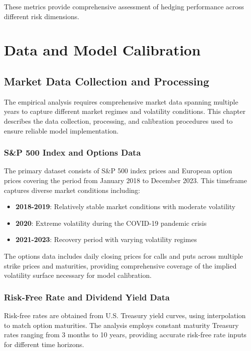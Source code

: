 \documentclass[12pt,a4paper]{report}
\begin{document}
These metrics provide comprehensive assessment of hedging performance across different risk dimensions.

\chapter{Data and Model Calibration}

\section{Market Data Collection and Processing}

The empirical analysis requires comprehensive market data spanning multiple years to capture different market regimes and volatility conditions. This chapter describes the data collection, processing, and calibration procedures used to ensure reliable model implementation.

\subsection{S\&P 500 Index and Options Data}

The primary dataset consists of S\&P 500 index prices and European option prices covering the period from January 2018 to December 2023. This timeframe captures diverse market conditions including:

\begin{itemize}
\item \textbf{2018-2019}: Relatively stable market conditions with moderate volatility
\item \textbf{2020}: Extreme volatility during the COVID-19 pandemic crisis
\item \textbf{2021-2023}: Recovery period with varying volatility regimes
\end{itemize}

The options data includes daily closing prices for calls and puts across multiple strike prices and maturities, providing comprehensive coverage of the implied volatility surface necessary for model calibration.

\subsection{Risk-Free Rate and Dividend Yield Data}

Risk-free rates are obtained from U.S. Treasury yield curves, using interpolation to match option maturities. The analysis employs constant maturity Treasury rates ranging from 3 months to 10 years, providing accurate risk-free rate inputs for different time horizons.
\end{document}
